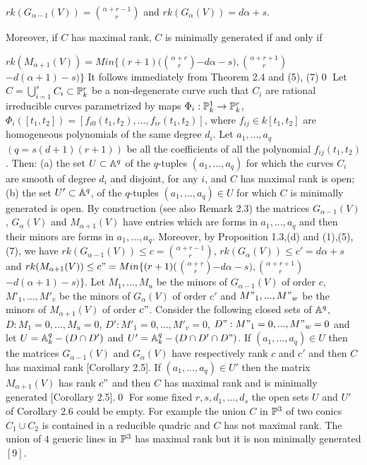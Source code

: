 $ rk(G_{\alpha-1}(V))=$$\alpha+r-1\choose r$$ $ and
$ rk(G_{\alpha}(V))=d\alpha+s $.\medskip

Moreover, if $C$ has maximal rank, $C$ is minimally generated
if and only if \medskip
 
$rk(M_{\alpha+1}(V))= Min\{(r+1)($$\alpha+r\choose r$$-d\alpha-s) , 
$$\alpha+r+1\choose r$$-d(\alpha+1)-s)\}$\medskip \endproclaim
{} It follows immediately from Theorem 2.4 and (5),
(7)\qed\enddemo 
{}  Let $C=$$\bigcup_{i=1}^s$$ C_i  \subset \Bbb
P_k^r$
 be a  non-degenerate  curve
such that $C_i$ are rational irreducible curves parametrized by maps 
$\Phi_i:\Bbb P_k^1 \rightarrow \Bbb P_k^r$,
 $\Phi_i([t_1,t_2])=[f_{i0}(t_1,t_2),...,f_{ir}(t_1,t_2)]$, 
where $f_{ij}\in k[t_1,t_2]$
are homogeneous polynomials of the same degree $d_i$. Let $a_1,...,a_q$
 $(q=s(d+1)(r+1))$
 be all the coefficients of all the polynomial $f_{ij}(t_1,t_2)$.
Then:\medskip
(a) the set $U\subset\Bbb A^q$ of  the $q$-tuples $(a_1,...,a_q)$ for
which 
 the curves 
$C_i$ are smooth of degree $d_i$ and disjoint, for any $i$, and $C$ has
maximal rank
is open;\medskip
(b) the  set $U'\subset\Bbb A^q$,
of the $q$-tuples $(a_1,...,a_q)\in U$ for which $C$ is minimally
generated is open.\endproclaim
{} By construction (see also Remark 2.3) the matrices 
$G_{\alpha-1}(V)$, $G_\alpha(V)$ and $M_{\alpha+1}(V)$ 
have entries which are forms in 
$a_1,...,a_q$ and then their  minors are forms in 
$a_1,...,a_q$. Moreover, by Proposition 1.3,(d) and (1),(5),(7), we have
$ rk(G_{\alpha-1}(V)) \leq c=$$\alpha+r-1\choose r$$ $,
$ rk(G_{\alpha}(V))\leq c'=d\alpha+s $ and 
$rk(M_{\alpha+1}(V)) \leq c"=Min\{(r+1)($$\alpha+r\choose r$$-d\alpha-s) , 
$$\alpha+r+1\choose r$$-d(\alpha+1)-s)\}$. Let  $M_1,...,M_u$  
 be  the  minors of 
$G_{\alpha-1}(V)$ of order $c$, $M'_1,...,M'_v$ be the minors of
$G_\alpha(V)$ of
order $c'$ and  $M"_1,...,M"_w$ be the minors of $M_{\alpha+1}(V)$ of
order  $c"$.
 Consider the 
following closed sets of $\Bbb A^q$, $D: M_1=0,...,M_u=0$, 
$D': M'_1=0,...,M'_v=0$,
$D": M"_1=0,...,M"_w=0$ and let $U=\Bbb A_k^q- (D\cap D')$ and
$U'=\Bbb A_k^q- (D\cap D'\cap D")$.  
If $(a_1,...,a_q)\in U$ then the matrices 
$G_{\alpha-1}(V)$ and $G_\alpha(V)$ have respectively rank $c$ and $c'$
and then $C$ has maximal rank 
[Corollary 2.5].
If $(a_1,...,a_q)\in U'$ then  the matrix $M_{\alpha+1}(V)$  has  rank
$c"$
and then $C$ has maximal rank and is minimally
generated [Corollary 2.5].\qed\enddemo
{} For some fixed
$r,s,d_1,...,d_s$ the open sets $U$ and $U'$ of Corollary $2.6$  could be
empty. For example  the union $C$ in $\Bbb P^3$ of
 two conics $C_1\cup C_2$ is contained
 in a reducible quadric and $C$ has not maximal rank. The union of $4$
generic 
lines in $\Bbb P^3$ has maximal rank but it is non minimally generated
$[9]$.\endproclaim 

